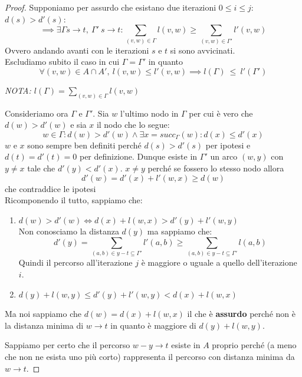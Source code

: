 \documentclass[a4paper, 11pt]{report}
\begin{document}
\begin{proof}
            Supponiamo per assurdo che esistano due iterazioni $0 \le i\le j :$\\$ d(s) > d'(s)$:
            \[\implies \exists \Gamma s\rightarrow t,\ \Gamma ' \ s \rightarrow t : \sum_{(v,w)\in \Gamma} l(v,w) \ge \sum_{(v,w)\in \Gamma'} l'(v,w)\]
            Ovvero andando avanti con le iterazioni $s$ e $t$ si sono avvicinati.\\
            Escludiamo subito il caso in cui $\Gamma = \Gamma'$ in quanto
            \[\forall (v,w)\in A\cap A',\  l(v,w) \le l'(v,w)\implies l(\Gamma)\ \le\ l'(\Gamma')\]
            \begin{center}
                \textit{NOTA: $l(\Gamma) = \sum_{(v,w)\in \Gamma} l(v,w)$}
            \end{center}
            Consideriamo ora $\Gamma$ e $\Gamma'$. Sia $w$ l'ultimo nodo in $\Gamma$ per cui è vero che $d(w)> d'(w)$ e sia $x$ il nodo che lo segue:
            \[w \in \Gamma : d(w) > d'(w) \land \exists x = succ_\Gamma(w) : d(x)\le d'(x)\]
            $w$ e $x$ sono sempre ben definiti perché $d(s)>d'(s)$ per ipotesi e $d(t) = d'(t) = 0$ per definizione.
            Dunque esiste in $\Gamma'$ un arco $(w,y)$ con $y \not = x$ tale che $d'(y) < d'(x)$. $x \not = y$ perché se fossero lo stesso nodo allora \[d'(w) = d'(x) + l'(w,x)\ge d(w)\]
                che contraddice le ipotesi\\
            Ricomponendo il tutto, sappiamo che:
            \begin{enumerate}
                \item $d(w)>d'(w) \iff d(x) + l(w,x) > d'(y) + l'(w,y)$ \\Non conosciamo la distanza $d(y)$ ma sappiamo che:
                \[d'(y) = \sum_{(a,b)\in y-t\subseteq \Gamma'}l'(a,b) \ge \sum_{(a,b)\in y-t\subseteq \Gamma'}l(a,b) \]
                Quindi il percorso all'iterazione $j$ è maggiore o uguale a quello dell'iterazione $i$.
                \item $d(y) +l(w,y) \le d'(y) +l'(w,y) < d(x) +l(w,x)$  
            \end{enumerate}
            Ma noi sappiamo che $d(w) = d(x) +l(w,x)$ il che è \textbf{assurdo} perché non è la distanza minima di $w\rightarrow t$ in quanto è maggiore di 
            $d(y) +l(w,y)$. 
            
            Sappiamo per certo che il percorso $w-y\rightarrow t$ esiste in $A$ proprio perché (a meno che non ne esista uno più corto) rappresenta il percorso con distanza minima da $w\rightarrow t$.


\end{proof}
\end{document}
